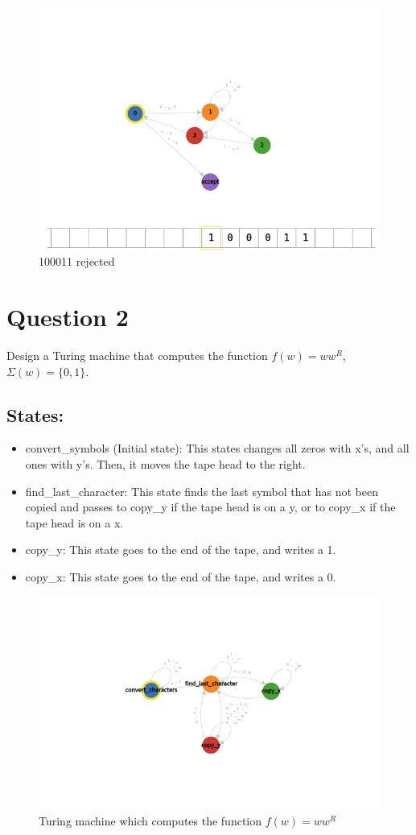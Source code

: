 \documentclass[12pt]{article}
\begin{document}
\begin{figure}[H]
    \caption{100011 rejected}
    \centering
    \includegraphics[width=12cm]{Q1/100011o.png}
\end{figure}
\section*{Question 2}
Design a Turing machine that computes the function $f(w) = ww^R$, $\Sigma(w) = \{0, 1\}$.
\subsection*{States:}
\begin{itemize}
    \item convert{\_}symbols (Initial state): This states changes all zeros with x's, and all ones with y's. Then, it moves the tape head to the right.
    \item find{\_}last{\_}character: This state finds the last symbol that has not been copied and passes to copy{\_}y if the tape head is on a y, or to copy{\_}x if the tape head is on a x.
    \item copy{\_}y: This state goes to the end of the tape, and writes a 1.
    \item copy{\_}x: This state goes to the end of the tape, and writes a 0.
\end{itemize}
\begin{figure}[H]
    \caption{Turing machine which computes the function $f(w) = ww^R$}
    \centering
    \includegraphics[width=17cm]{Q2/turingmachine.io_.png}
\end{figure}
\newpage
\end{document}
